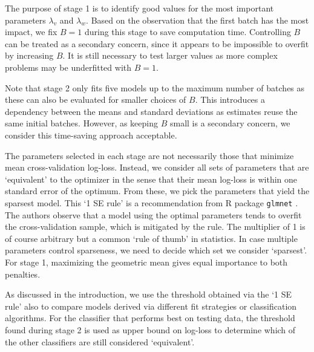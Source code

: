 %
The purpose of stage 1 is to identify good values for the most important parameters $\lambda_v$ and $\lambda_w$.
Based on the observation that the first batch has the most impact, we fix $B=1$ during this stage to save computation time.
Controlling $B$ can be treated as a secondary concern, since it appears to be impossible to overfit by increasing $B$.
It is still necessary to test larger values as more complex problems may be underfitted with $B=1$.\par
%
Note that stage 2 only fits five models up to the maximum number of batches as these can also be evaluated for smaller choices of $B$.
This introduces a dependency between the means and standard deviations as estimates reuse the same initial batches.
However, as keeping $B$ small is a secondary concern, we consider this time-saving approach acceptable.\par
%
The parameters selected in each stage are not necessarily those that minimize mean cross-validation log-loss.
Instead, we consider all sets of parameters that are `equivalent' to the optimizer in the sense that their mean log-loss is within one standard error of the optimum.
From these, we pick the parameters that yield the sparsest model.
This `1 SE rule' is a recommendation from R package \texttt{glmnet} \cite{Friedman_10}.
The authors observe that a model using the optimal parameters tends to overfit the cross-validation sample, which is mitigated by the rule.
The multiplier of 1 is of course arbitrary but a common `rule of thumb' in statistics.
In case multiple parameters control sparseness, we need to decide which set we consider `sparsest'.
For stage 1, maximizing the geometric mean gives equal importance to both penalties.\par
%
As discussed in the introduction, we use the threshold obtained via the `1 SE rule' also to compare models derived via different fit strategies or classification algorithms.
For the classifier that performs best on testing data, the threshold found during stage 2 is used as upper bound on log-loss to determine which of the other classifiers are still considered `equivalent'.
%

